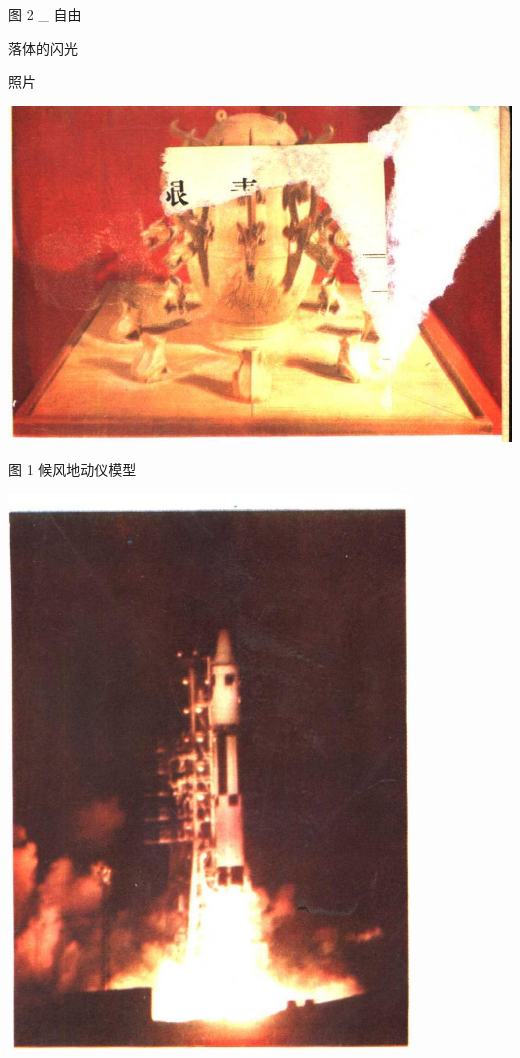 \documentclass[10pt]{article}
\begin{document}
图 2 \_ 自由

落体的闪光

照片

\begin{center}
\includegraphics[max width=1.0\textwidth]{images/01912d55-147c-70aa-b0e0-1782a122f948_3_714981.jpg}
\end{center}

图 1 候风地动仪模型

\begin{center}
\includegraphics[max width=0.8\textwidth]{images/01912d55-147c-70aa-b0e0-1782a122f948_3_135871.jpg}
\end{center}
\end{document}
